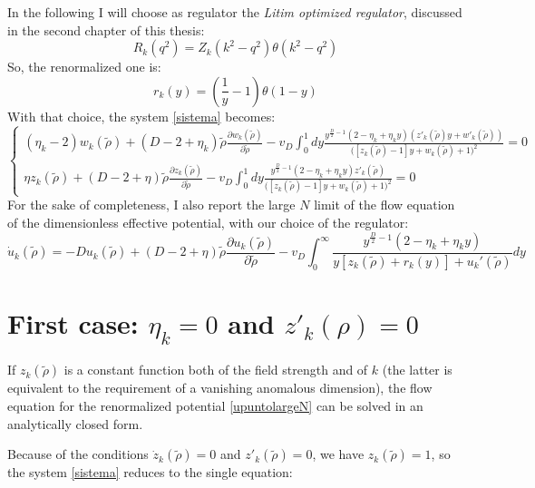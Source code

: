 In the following I will choose as regulator the \emph{Litim optimized regulator}, discussed in the second chapter of this thesis:
\begin{equation}
R_k(q^2) = Z_k(k^2 - q^2)\theta(k^2 - q^2)
\end{equation}
So, the renormalized one is:
\begin{equation}
{r}_k(y) = \left(\frac{1}{y} - 1\right)\theta(1-y)
\end{equation}
With that choice, the system \eqref{sistema} becomes:
\begin{equation}
\left\{
\begin{array}{l}
(\eta_k -2 )w_k(\widetilde{\rho}) + (D-2 +\eta_k)\widetilde{\rho}\frac{\partial w_k(\widetilde{\rho})}{\partial \widetilde{\rho}} - v_D\int_0^1 dy \frac{y^{\frac{D}{2}-1}    (2-\eta_k + \eta_ky)(z'_k(\widetilde{\rho})y + w'_k(\widetilde{\rho}))}{\big([z_k(\widetilde{\rho}) -1 ]y  +  w_k(\widetilde{\rho})+ 1\big)^2} = 0\\
\eta z_k(\widetilde{\rho}) + (D-2+\eta)\widetilde{\rho}\frac{\partial z_k(\widetilde{\rho})}{\partial \widetilde{\rho}}  -v_D\int_0^1 dy \frac{y^{\frac{D}{2}-1}  (2-\eta_k + \eta_ky) z'_k(\widetilde{\rho})}{\big([z_k(\widetilde{\rho}) -1 ]y  +  w_k(\widetilde{\rho})+ 1\big)^2} = 0
\end{array}
\right.
\end{equation}
For the sake of completeness, I also report the large $N$ limit of the flow equation of the dimensionless effective potential, with our choice of the regulator:
\begin{equation}
 \dot{u}_k(\widetilde{\rho}) = -D  u_k(\widetilde{\rho}) +(D - 2 + \eta)\widetilde{\rho}\frac{\partial u_k(\widetilde{\rho})}{\partial \widetilde{\rho}} - v_D \int_0^\infty  \frac{y^{\frac{D}{2}-1}  (2-\eta_k + \eta_ky) }{y[z_k(\widetilde{\rho}) + r_k(y)] + u_k'(\widetilde{\rho})} dy 
\end{equation}

\section{First case: $\eta_k = 0$ and $z'_k(\rho)= 0$}
If $z_k(\widetilde{\rho})$ is a constant function both of the field strength and of $k$ (the latter is equivalent to the 
requirement of a vanishing anomalous dimension), the flow equation for the renormalized potential \eqref{upuntolargeN} can be solved
in an analytically closed form\cite{1}\cite{12}\cite{13}.

Because of the conditions $\dot{z}_k(\widetilde{\rho}) = 0$ and $z'_k(\widetilde{\rho}) = 0$, we have ${z}_k(\widetilde{\rho}) = 1$, so the system \eqref{sistema} reduces to the single equation:

